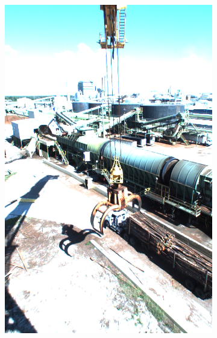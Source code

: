 \begin{figure}[h]
\begin{subfigure}[c]{0.24\textwidth}
			\includegraphics[width=1\textwidth]{bilder/Grundlagen/Daten_Bildqualitaet/hell.png}
		\end{subfigure}
		\begin{subfigure}[c]{0.24\textwidth}			

\end{subfigure}
\end{figure}
